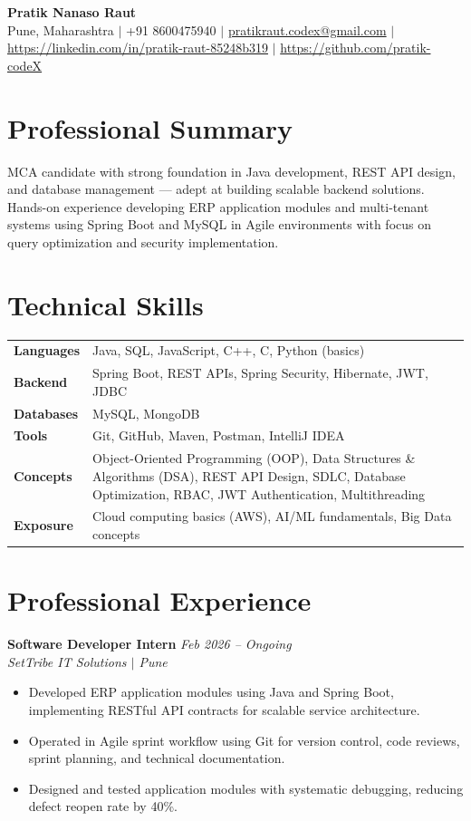 \documentclass[10.5pt,a4paper]{article}
\begin{document}
\begin{center}
{\Large\bfseries Pratik Nanaso Raut}\\[2pt]
Pune, Maharashtra $|$ +91 8600475940 $|$ \href{mailto:pratikraut.codex@gmail.com}{pratikraut.codex@gmail.com} $|$ \href{https://linkedin.com/in/pratik-raut-85248b319}{https://linkedin.com/in/pratik-raut-85248b319} $|$ \href{https://github.com/pratik-codeX}{https://github.com/pratik-codeX}
\end{center}
\vspace{-2pt}
\section{Professional Summary}
MCA candidate with strong foundation in Java development, REST API design, and database management — adept at building scalable backend solutions.\\[2pt]
Hands-on experience developing ERP application modules and multi-tenant systems using Spring Boot and MySQL in Agile environments with focus on query optimization and security implementation.
\section{Technical Skills}
\begin{tabular}{@{}p{}p{}@{}}
\textbf{Languages} & Java, SQL, JavaScript, C++, C, Python (basics) \\[1pt]
\textbf{Backend} & Spring Boot, REST APIs, Spring Security, Hibernate, JWT, JDBC \\[1pt]
\textbf{Databases} & MySQL, MongoDB \\[1pt]
\textbf{Tools} & Git, GitHub, Maven, Postman, IntelliJ IDEA \\[1pt]
\textbf{Concepts} & Object-Oriented Programming (OOP), Data Structures \& Algorithms (DSA), REST API Design, SDLC, Database Optimization, RBAC, JWT Authentication, Multithreading \\[1pt]
\textbf{Exposure} & Cloud computing basics (AWS), AI/ML fundamentals, Big Data concepts \\
\end{tabular}
\section{Professional Experience}
\textbf{Software Developer Intern} \hfill \textit{Feb 2026 -- Ongoing}
\\\textit{SetTribe IT Solutions $|$ Pune}
\begin{itemize}
  \item Developed ERP application modules using Java and Spring Boot, implementing RESTful API contracts for scalable service architecture.
  \item Operated in Agile sprint workflow using Git for version control, code reviews, sprint planning, and technical documentation.
  \item Designed and tested application modules with systematic debugging, reducing defect reopen rate by 40\%.
\end{itemize}
\end{document}
